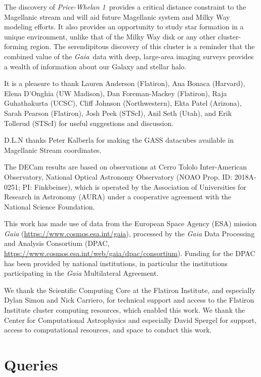 \documentclass[twocolumn]{aastex62}
\newcommand{\gaia}{\textsl{Gaia}}
\newcommand{\clustername}{\textsl{Price-Whelan 1}}
\begin{document}
The discovery of \clustername\ provides a critical distance constraint to the Magellanic stream and will aid future Magellanic system and Milky Way modeling efforts.
It also provides an opportunity to study star formation in a unique environment, unlike that of the Milky Way disk or any other cluster-forming region.
The serendipitous discovery of this cluster is a reminder that the combined value of the \gaia\ data with deep, large-area imaging surveys provides a wealth of information about our Galaxy and stellar halo.


\acknowledgments

It is a pleasure to thank
Lauren Anderson (Flatiron),
Ana Bonaca (Harvard),
Elena D'Onghia (UW Madison),
Dan Foreman-Mackey (Flatiron),
Raja Guhathakurta (UCSC),
Cliff Johnson (Northwestern),
Ekta Patel (Arizona),
Sarah Pearson (Flatiron),
Josh Peek (STScI),
Anil Seth (Utah),
and Erik Tollerud (STScI)
for useful suggestions and discussion.

D.L.N thanks Peter Kalberla for making the GASS datacubes available in Magellanic Stream coordinates.

The DECam results are based on observations at Cerro Tololo Inter-American Observatory, National Optical Astronomy Observatory (NOAO Prop. ID: 2018A-0251; PI: Finkbeiner), which is operated by the Association of Universities for Research in Astronomy (AURA) under a cooperative agreement with the National Science Foundation.

This work has made use of data from the European Space Agency (ESA)
mission {\it Gaia} (\url{https://www.cosmos.esa.int/gaia}), processed by
the {\it Gaia} Data Processing and Analysis Consortium (DPAC,
\url{https://www.cosmos.esa.int/web/gaia/dpac/consortium}). Funding
for the DPAC has been provided by national institutions, in particular
the institutions participating in the {\it Gaia} Multilateral Agreement.

We thank the Scientific Computing Core at the Flatiron Institute, and especially Dylan Simon and Nick Carriero, for technical support and access to the Flatiron Institute cluster computing resources, which enabled this work.
We thank the Center for Computational Astrophysics and especially David Spergel for support, access to computational resources, and space to conduct this work.

\clearpage

\appendix

\section{Queries}
\label{sec:queries}
\end{document}

